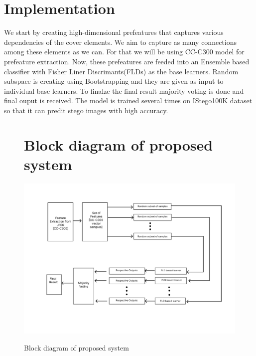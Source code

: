 \section{Implementation}
We start by creating high-dimensional prefeatures that captures various dependencies of the cover elements. We aim to capture as many connections among these elements as we can. For that we will be using CC-C300 model\cite{8} for prefeature extraction. Now, these prefeatures are feeded into an Ensemble based classifier with Fisher Liner Discrimants(FLDs) as the base learners. Random subspace is creating using Bootstrapping and they are given as input to individual base learners. To finalze the final result majority voting is done and final ouput is received. The model is trained several times on IStego100K dataset so that it can predit stego images with high accuracy. 
\begin{figure}[H]
\section{Block diagram of proposed system}
 \centering
\includegraphics[width=140mm]{./img/model.png}\\
\caption{ Block diagram of proposed system}
\end{figure}
\clearpage

